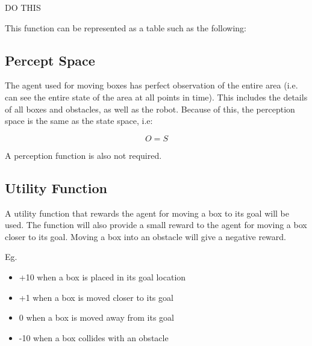 DO THIS

This function can be represented as a table such as the following:


\subsection{Percept Space}

The agent used for moving boxes has perfect observation of the entire area
(i.e. can see the entire state of the area at all points in time).
This includes the details of all boxes and obstacles, as well as the robot.
Because of this, the perception space is the same as the state space, i.e:

$$
O = S
$$

A perception function is also not required.


\subsection{Utility Function}
A utility function that rewards the agent for moving a box to its goal will be used.
The function will also provide a small reward to the agent for moving a box closer to its goal.
Moving a box into an obstacle will give a negative reward.

Eg.
\begin{itemize}
\item +10 when a box is placed in its goal location
\item +1 when a box is moved closer to its goal
\item 0 when a box is moved away from its goal
\item -10 when a box collides with an obstacle
\end{itemize}